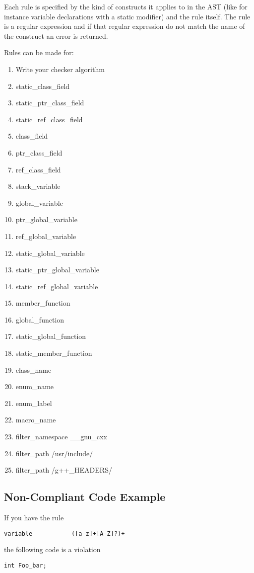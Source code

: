 Each rule is specified by the kind of constructs it applies to in the AST (like for instance variable
	declarations with a static modifier) and the rule itself. The rule is a regular expression and if
that regular expression do not match the name of the construct an error is returned.

Rules can be made for:
\begin{enumerate}

\item Write your checker algorithm
\item static\_class\_field
\item static\_ptr\_class\_field 
\item static\_ref\_class\_field
\item class\_field
\item ptr\_class\_field
\item ref\_class\_field
\item stack\_variable    
\item global\_variable
\item ptr\_global\_variable 
\item ref\_global\_variable 
\item static\_global\_variable 
\item static\_ptr\_global\_variable 
\item static\_ref\_global\_variable 
\item member\_function 
\item global\_function
\item static\_global\_function 
\item static\_member\_function
\item class\_name
\item enum\_name
\item enum\_label
\item macro\_name
\item filter\_namespace \_\_gnu\_cxx
\item filter\_path /usr/include/
\item filter\_path /g++\_HEADERS/
\end{enumerate}

\subsection{Non-Compliant Code Example}

If you have the rule 
\begin{verbatim}
variable           ([a-z]+[A-Z]?)+
\end{verbatim}
the following code is a violation
\begin{verbatim}
int Foo_bar;
\end{verbatim}

